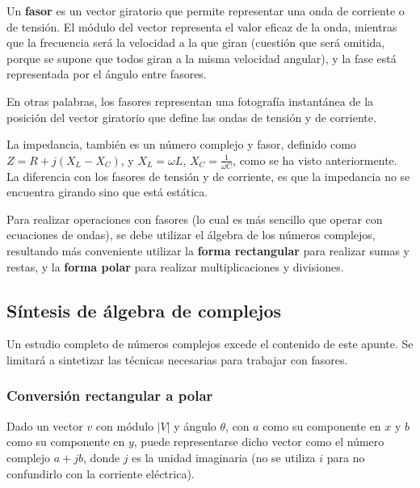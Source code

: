 
Un \textbf{fasor} es un vector giratorio que permite representar una onda de corriente o de tensión. El módulo del vector representa el valor eficaz de la onda, mientras que la frecuencia será la velocidad a la que giran (cuestión que será omitida, porque se supone que todos giran a la misma velocidad angular), y la fase está representada por el ángulo entre fasores.

En otras palabras, los fasores representan una fotografía instantánea de la posición del vector giratorio que define las ondas de tensión y de corriente.

La impedancia, también es un número complejo y fasor, definido como $Z= R+j(X_L - X_C)$, y $X_L = \omega L $, $X_C = \frac{1}{\omega C}$, como se ha visto anteriormente. La diferencia con los fasores de tensión y de corriente, es que la impedancia no se encuentra girando sino que está estática.

Para realizar operaciones con fasores (lo cual es más sencillo que operar con ecuaciones de ondas), se debe utilizar el álgebra de los números complejos, resultando más conveniente utilizar la \textbf{forma rectangular} para realizar sumas y restas, y la \textbf{forma polar} para realizar multiplicaciones y divisiones.

\subsection{Síntesis de álgebra de complejos}

Un estudio completo de números complejos excede el contenido de este apunte. Se limitará a sintetizar las técnicas necesarias para trabajar con fasores.

\subsubsection{Conversión rectangular a polar}

Dado un vector $v$ con módulo $|V|$ y ángulo $\theta$, con $a$ como su componente en $x$ y $b$ como su componente en $y$, puede representarse dicho vector como el número complejo $a+jb$, donde $j$ es la unidad imaginaria (no se utiliza $i$ para no confundirlo con la corriente eléctrica).



